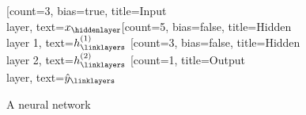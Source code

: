 \begin{figure}
  \centering
 \begin{neuralnetwork}[height=5]
        \newcommand{\x}[2]{$x_#2$}
        \newcommand{\y}[2]{$\hat{y}_#2$}
        \newcommand{\hfirst}[2]{\small $h^{(1)}_#2$}
        \newcommand{\hsecond}[2]{\small $h^{(2)}_#2$}
        [count=3, bias=true, title=Input\\layer, text=\x]
        \hiddenlayer[count=5, bias=false, title=Hidden\\layer 1, text=\hfirst] \linklayers
        \hiddenlayer[count=3, bias=false, title=Hidden\\layer 2, text=\hsecond] \linklayers
        \outputlayer[count=1, title=Output\\layer, text=\y] \linklayers
 \end{neuralnetwork}
\caption{A neural network \label{fig:hiddenlayers}}
\end{figure}



